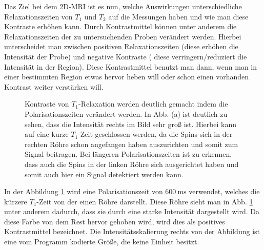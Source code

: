 Das Ziel bei dem 2D-MRI ist es nun, welche Auswirkungen unterschiedliche Relaxationszeiten von $T_1$ und $T_2$ auf die Messungen haben und wie man diese Kontraste erhöhen kann. Durch Kontrastmittel können unter anderem die Relaxationszeiten der zu untersuchenden Proben verändert werden. Hierbei unterscheidet man zwischen positiven Relaxationszeiten (diese erhöhen die Intensität der Probe) und negative Kontraste ( diese verringern/reduziert die Intensität in der Region).  Diese Kontrastmittel benutzt man dann, wenn man in einer bestimmten Region etwas hervor heben will oder schon einen vorhanden Kontrast weiter verstärken will.   
\begin{figure}[H]
\centering
{}
{}
{}
{}
\caption[Kontraste von $T_1$-Relaxation werden deutlich gemacht indem die Polarisationszeiten verändert werden]{Kontraste von $T_1$-Relaxation werden deutlich gemacht indem die Polarisationszeiten verändert werden. In Abb. (a) ist deutlich zu sehen, dass die Intensität rechts im Bild sehr groß ist. Hierbei kann auf eine kurze $T_1$-Zeit geschlossen werden, da die Spins sich in der rechten Röhre schon angefangen haben auszurichten und somit zum Signal beitragen. Bei längeren Polarisationszeiten ist zu erkennen, dass auch die Spins in der linken Röhre sich ausgerichtet haben und somit auch hier ein Signal detektiert werden kann. }\label{fig:11600}
\end{figure}
In der Abbildung \ref{fig:11600} wird eine Polarisationszeit von $\SI{600}{\milli\second}$ verwendet,
 welches die kürzere $T_1$-Zeit von der einen Röhre darstellt. Diese Röhre sieht man in Abb. \ref{fig:11600} unter anderem dadurch,
dass sie durch eine starke Intensität dargestellt wird. Da diese Farbe von dem Rest hervor gehoben wird, wird dies als positives Kontrastmittel bezeichnet.
Die Intensitätsskalierung rechts von der Abbildung ist eine vom Programm kodierte Größe, die keine Einheit besitzt.\\

